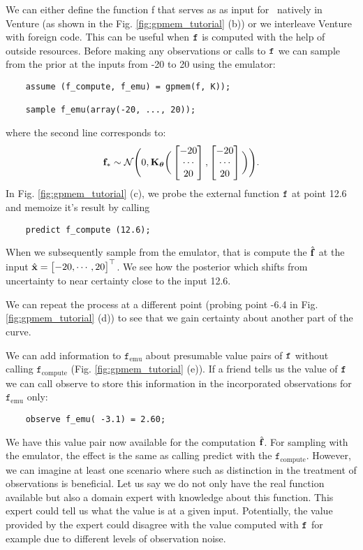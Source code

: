 We can either define the function f that serves as as input for \gpmem\
 natively in Venture
(as shown in the Fig. \ref{fig:gpmem_tutorial} (b)) or we interleave Venture with foreign code. 
This can be useful when $\texttt{f}$ is computed with the help of outside resources.
Before making any observations or calls to $\texttt{f}$
we can sample from the prior at the inputs from -20 to 20 using the emulator:
    \begin{lstlisting}
    assume (f_compute, f_emu) = gpmem(f, K));

    sample f_emu(array(-20, ..., 20));
    \end{lstlisting}
where the second line corresponds to:
\[ 
\mathbf{f}_* \sim \mathcal{N}\Bigg(0,\mathbf{K}_{\bm{\theta}}\bigg(
\begin{bmatrix} 
-20 \\
\cdots \\
20
 \end{bmatrix},
\begin{bmatrix} 
-20 \\
\cdots \\
20
 \end{bmatrix}
\bigg)
\Bigg).
\]
In Fig. \ref{fig:gpmem_tutorial} (c), we probe the external function $\texttt{f}$ at point 12.6 and memoize it's result by calling 
   \begin{lstlisting}
    predict f_compute (12.6);
    \end{lstlisting}
When we subsequently sample from the emulator, that is compute the $\hat{\mathbf{f}}$ at the input
$\hat{\mathbf{x}}= \begin{bmatrix} -20, \cdots, 20 \end{bmatrix}^\top$. We see how the posterior which shifts from uncertainty to near certainty close to the input 12.6.

We can repeat the process at a different point (probing point -6.4 in Fig.
\ref{fig:gpmem_tutorial} (d)) to see that we gain certainty about another part of the curve. 

We can add information to $\texttt{f}_\text{emu}$ about presumable value pairs of $\texttt{f}$ without calling $\texttt{f}_\text{compute}$
(Fig. \ref{fig:gpmem_tutorial} (e)).
If a friend tells us the value of $\texttt{f}$ we can call observe to store this information in the incorporated observations for $\texttt{f}_\text{emu}$ only:
    \begin{lstlisting}
    observe f_emu( -3.1) = 2.60;
    \end{lstlisting}
We have this value pair now available for the computation $\hat{\mathbf{f}}$. 
For sampling with the emulator, the effect is the same as calling predict with the $\texttt{f}_\text{compute}$.
However, we can imagine at least one scenario where such as distinction in the treatment of observations 
is beneficial. Let us say we do not only have the real function available but also a domain expert with knowledge 
about this function.
This expert could tell us what the value is at a given input.
Potentially, the value provided by the expert could disagree with the value computed with $\texttt{f}$ for example 
due to different levels of observation noise. 

